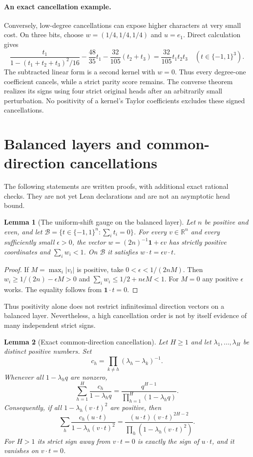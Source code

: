 \documentclass[11pt]{article}
\newtheorem{lemma}{Lemma}
\begin{document}
\paragraph{An exact cancellation example.}
Conversely, low-degree cancellations can expose higher characters at
very small cost. On three bits, choose $w=(1/4,1/4,1/4)$ and $u=e_1$.
Direct calculation gives
\[
 \frac{t_1}{1-(t_1+t_2+t_3)^2/16}
 -\frac{48}{35}t_1-\frac{32}{105}(t_2+t_3)
 =\frac{32}{105}t_1t_2t_3
 \quad(t\in\{-1,1\}^3).
\]
The subtracted linear form is a second kernel with $w=0$.
Thus every degree-one coefficient cancels, while a strict parity score
remains. The converse theorem realizes its signs using four strict
original heads after an arbitrarily small perturbation. No positivity
of a kernel's Taylor coefficients excludes these signed cancellations.

\section{Balanced layers and common-direction cancellations}

The following statements are written proofs, with additional exact
rational checks. They are not yet Lean declarations and are not an
asymptotic head bound.

\begin{lemma}[The uniform-shift gauge on the balanced layer]
Let $n$ be positive and even, and let
$\mathcal B=\{t\in\{-1,1\}^n:\sum_i t_i=0\}$.
For every $v\in\mathbb R^n$ and every sufficiently small $\epsilon>0$,
the vector $w=(2n)^{-1}\mathbf1+\epsilon v$ has strictly positive
coordinates and $\sum_iw_i<1$. On $\mathcal B$ it satisfies
$w\cdot t=\epsilon v\cdot t$.
\end{lemma}

\begin{proof}
If $M=\max_i|v_i|$ is positive, take
$0<\epsilon<1/(2nM)$. Then
$w_i\geq1/(2n)-\epsilon M>0$ and
$\sum_iw_i\leq1/2+n\epsilon M<1$.
For $M=0$ any positive $\epsilon$ works. The equality follows from
$\mathbf1\cdot t=0$.
\end{proof}

Thus positivity alone does not restrict infinitesimal direction vectors
on a balanced layer. Nevertheless, a high cancellation order is not by
itself evidence of many independent strict signs.

\begin{lemma}[Exact common-direction cancellation]
Let $H\geq1$ and let $\lambda_1,\ldots,\lambda_H$ be distinct positive
numbers. Set
\[
 c_h=\prod_{k\ne h}(\lambda_h-\lambda_k)^{-1}.
\]
Whenever all $1-\lambda_hq$ are nonzero,
\[
 \sum_{h=1}^H\frac{c_h}{1-\lambda_hq}
 =\frac{q^{H-1}}{\prod_{h=1}^H(1-\lambda_hq)}.
\]
Consequently, if all $1-\lambda_h(v\cdot t)^2$ are positive, then
\[
 \sum_h\frac{c_h(u\cdot t)}{1-\lambda_h(v\cdot t)^2}
 =\frac{(u\cdot t)(v\cdot t)^{2H-2}}
        {\prod_h(1-\lambda_h(v\cdot t)^2)}.
\]
For $H>1$ its strict sign away from $v\cdot t=0$ is exactly the sign
of $u\cdot t$, and it vanishes on $v\cdot t=0$.
\end{lemma}
\end{document}
